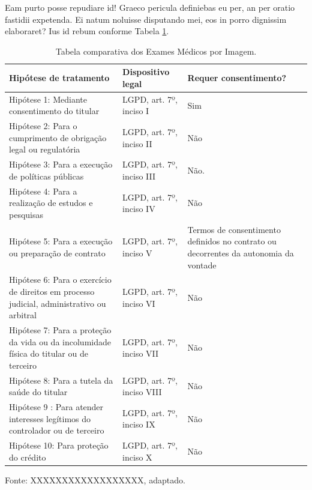 \documentclass[
	12pt,				%
	openright,			%
	oneside,			%
	a4paper,			%
	english,			%
	french,				%
	spanish,			%
	brazil,				%
	]{abntex2}
\begin{document}
Eam purto posse repudiare id! Graeco pericula definiebas eu per, an per oratio fastidii expetenda. Ei natum noluisse disputando mei, eos in porro dignissim elaboraret? Ius id rebum conforme Tabela \ref{tab: comparacao de exames}.
\begin{table}[ht]
    \centering
    \caption{Tabela comparativa dos Exames Médicos por Imagem.}
    \label{tab: comparacao de exames}
    \begin{tabular}{|p{5 cm}|p{4.5cm}|p{5cm}|} 
        \hline
        \textbf{Hipótese de tratamento} & \textbf{Dispositivo legal} & \textbf{Requer consentimento?} \\ \hline
        
         Hipótese 1: Mediante consentimento do titular & LGPD, art. 7º, inciso I & Sim \\ \hline
         
        Hipótese 2: Para o cumprimento de obrigação legal ou regulatória & LGPD, art. 7º, inciso II & Não  \\ \hline
        
        Hipótese 3: Para a execução de políticas públicas
 & LGPD, art. 7º, inciso III & Não. \\ \hline
 
        Hipótese 4: Para a realização de estudos e pesquisas & LGPD, art. 7º, inciso IV & Não  \\ \hline
        
        Hipótese 5: Para a execução ou preparação de contrato & LGPD, art. 7º, inciso V & Termos de consentimento definidos no contrato ou decorrentes da autonomia da vontade  \\ \hline
        
        Hipótese 6: Para o exercício de direitos em processo judicial, administrativo ou arbitral & LGPD, art. 7º, inciso VI & Não  \\ \hline
        
        Hipótese 7: Para a proteção da vida ou da incolumidade física do titular ou de terceiro & LGPD, art. 7º, inciso VII & Não  \\ \hline
        
        Hipótese 8: Para a tutela da saúde do titular & LGPD, art. 7º, inciso VIII & Não  \\ \hline
        
        Hipótese 9 : Para atender interesses legítimos do controlador ou de terceiro & LGPD, art. 7º, inciso IX & Não  \\ \hline
        
        Hipótese 10: Para proteção do crédito & LGPD, art. 7º, inciso X & Não  \\ \hline
    \end{tabular}
    \newline \newline Fonte: XXXXXXXXXXXXXXXXXX, adaptado.
\end{table}
\end{document}
